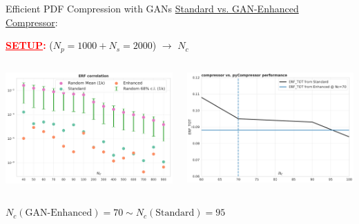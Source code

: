 \begin{frame}{Efficient PDF Compression with GANs}
	\underline{Standard vs. GAN-Enhanced Compressor}:
	\begin{center}
		\textcolor{red}{\textbf{\underline{SETUP}:}} ($N_p=1000 + N_s=2000$) 
		$\longrightarrow$ $N_c$
	\end{center}
	\begin{columns}[T] 
	\begin{column}{.5\textwidth}
	\includegraphics[width=\linewidth]{./gan_compressor/imgs/erf-validation.pdf}
	\end{column}
	\begin{column}{.5\textwidth}	
	\includegraphics[width=\linewidth]{./gan_compressor/imgs/performance.pdf}
	\end{column}
	\end{columns}
	\begin{center}
	\begin{tcolorbox}[width=9.5cm, halign=center, colframe=HallowGreen]
		$N_c (\text{GAN-Enhanced})=70 \sim N_c (\text{Standard})=95$
	\end{tcolorbox}
	\end{center}
\end{frame}